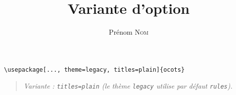 \documentclass[11pt]{ocots-book}
\title{Variante d'option}
\author{Prénom \textsc{Nom}}
\newcommand{\ocotsvariantnote}[1]{\begin{quote}\itshape Variante : #1\end{quote}}
\begin{document}
\maketitle

\begin{lstlisting}
\usepackage[..., theme=legacy, titles=plain]{ocots}
\end{lstlisting}
\ocotsvariantnote{\texttt{titles=plain} (le th\`eme \texttt{legacy} utilise par d\'efaut \texttt{rules}).}

\end{document}

